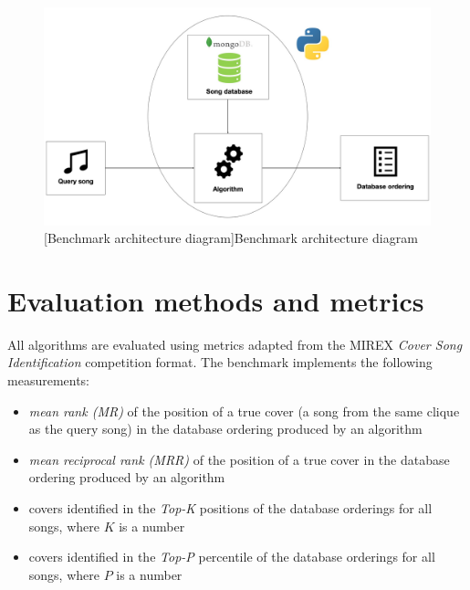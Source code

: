 \begin{figure}[H]
    \centering
    \includegraphics[width=\textwidth]{EvaluationTask/benchmark_architecture_2.jpg}
    [Benchmark architecture diagram]{Benchmark architecture diagram}
    \label{fig:bencharch}
\end{figure}

\section{Evaluation methods and metrics} 
\label{sec:evalmethods}
All algorithms are evaluated using metrics adapted from the MIREX \textit{Cover
Song Identification} competition format. The benchmark implements the following
measurements:
\begin{itemize}
    \item \textit{mean rank (MR)} of the position of a true cover (a song from
    the same clique as the query song) in the database ordering produced by an
    algorithm
    \item \textit{mean reciprocal rank (MRR)} of the position of a true cover in
   the database ordering produced by an algorithm
   \item covers identified in the \textit{Top-K} positions of the database
   orderings for all songs, where $K$ is a number 
   \item covers identified in the \textit{Top-P} percentile of the database
   orderings for all songs, where $P$ is a number 
\end{itemize}

